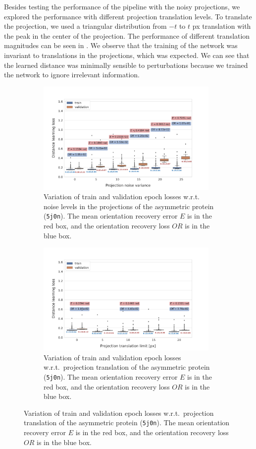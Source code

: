 Besides testing the performance of the pipeline with the noisy projections, we explored the performance with different projection translation levels.
To translate the projection, we used a triangular distribution from $-t$ to $t$ px translation with the peak in the center of the projection.
The performance of different translation magnitudes can be seen in .
We observe that the training of the network was invariant to translations in the projections, which was expected.
We can see that the learned distance was minimally sensible to perturbations because we trained the network to ignore irrelevant information.


\begin{figure}[ht!]
    \centering
    \begin{subfigure}[b]{0.47\textwidth}
        \includegraphics[height=5.5cm,valign=t]{figures/de_noises_nums}
        \caption{%
            Variation of train and validation epoch losses w.r.t. noise levels in the projections of the asymmetric protein (\texttt{5j0n}). The mean orientation recovery error $E$ is in the red box, and the orientation recovery loss $OR$ is in the blue box.
        }\label{fig:distance-estimation-vary-projection-noise}
    \end{subfigure}
    \hfill
    \begin{subfigure}[b]{0.47\textwidth}
        \includegraphics[height=5.5cm,valign=t]{figures/de_translation_nums}
        \caption{
        Variation of train and validation epoch losses w.r.t.\ projection translation of the asymmetric protein (\texttt{5j0n}). The mean orientation recovery error $E$ is in the red box, and the orientation recovery loss $OR$ is in the blue box.
    }\label{fig:distance-estimation-vary-projection-translation}
    \end{subfigure}
\end{figure}

